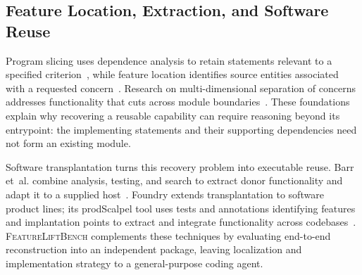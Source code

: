 \documentclass[acmsmall,screen,review,anonymous]{acmart}
\newcommand{\flb}{\textsc{FeatureLiftBench}\xspace}
\begin{document}








\subsection{Feature Location, Extraction, and Software Reuse}

Program slicing uses dependence analysis to retain statements relevant to a
specified criterion~\cite{weiser1984slicing}, while feature location identifies
source entities associated with a requested concern~\cite{dit2013featurelocation}.
Research on multi-dimensional separation of concerns addresses functionality
that cuts across module boundaries~\cite{tarr1999degrees}. These foundations
explain why recovering a reusable capability can require reasoning beyond its
entrypoint: the implementing statements and their supporting dependencies need
not form an existing module.

Software transplantation turns this recovery problem into executable reuse.
Barr et~al. combine analysis, testing, and search to extract donor functionality
and adapt it to a supplied host~\cite{barr2015transplantation}. Foundry extends
transplantation to software product lines; its prodScalpel tool uses tests and
annotations identifying features and implantation points to extract and
integrate functionality across codebases~\cite{souza2025foundry}.
\flb complements these techniques by evaluating end-to-end reconstruction into
an independent package, leaving localization and implementation strategy to a
general-purpose coding agent.
\end{document}
